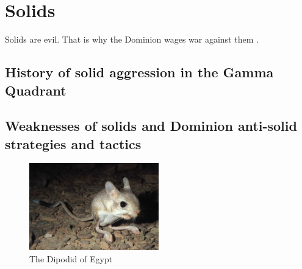 


\chapter{Solids}
Solids are evil. That is why the Dominion wages war against them \citep{Son-of-Moog:2488}.

\section{History of solid aggression in the Gamma Quadrant}
\section{Weaknesses of solids and Dominion anti-solid strategies and tactics}
\begin{figure}[h!]
 \label{jaculus}
 \centering
  \includegraphics[width=0.5\textwidth]{ch-solids/figures/jaculus.jpg}
 \caption{The Dipodid  of Egypt}
\end{figure}




